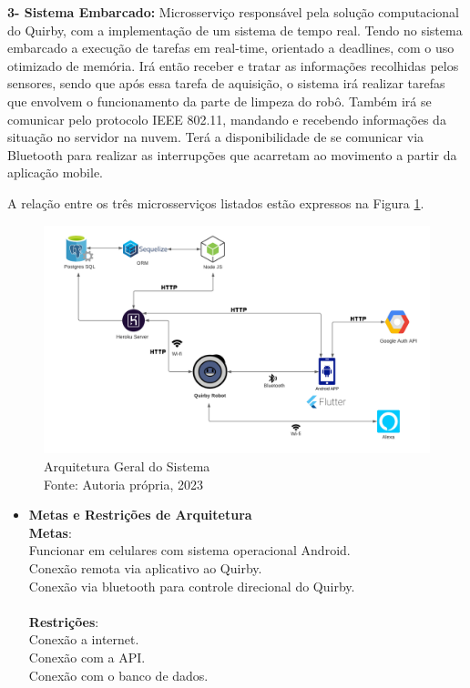 \textbf{3- Sistema Embarcado:} Microsserviço responsável pela solução computacional do Quirby, com a implementação de um sistema de tempo real. Tendo no sistema embarcado a execução de tarefas em real-time, orientado a deadlines, com o uso otimizado de memória. Irá então receber e tratar as informações recolhidas pelos sensores, sendo que após essa tarefa de aquisição, o sistema irá realizar tarefas que envolvem o funcionamento da parte de limpeza do robô. Também irá se comunicar pelo protocolo IEEE 802.11, mandando e recebendo informações da situação no servidor na nuvem. Terá a disponibilidade de se comunicar via Bluetooth para realizar as interrupções que acarretam ao movimento a partir da aplicação mobile.

A relação entre os três microsserviços listados estão expressos na Figura \ref{arquiteturaGeral}.\\
\begin{figure}[h!]
\includegraphics[width=\textwidth]{figuras/software/arquiteturaQuirby.png}
\caption{Arquitetura Geral do Sistema \\ Fonte: Autoria própria, 2023}
\label{arquiteturaGeral}
\end{figure}

\begin{itemize}
\item \textbf{Metas e Restrições de Arquitetura}\\
\textbf{Metas}:\\
\quad Funcionar em celulares com sistema operacional Android.\\
\quad Conexão remota via aplicativo ao Quirby.\\
\quad Conexão via bluetooth para controle direcional do Quirby.\\
\\
\textbf{Restrições}:\\
\quad Conexão a internet.\\
\quad Conexão com a API.\\
\quad Conexão com o banco de dados.\\
\end{itemize}

